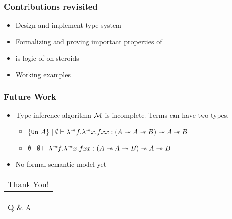 \begin{frame}[fragile, c]
    \frametitle{Contributions revisited}
  \begin{itemize}
  \item
    Design and implement \qub{} type system
  \item Formalizing and proving important properties of \qub{}
  \item \qub{} is logic of \BI on steroids
  \item {\color{red}Working examples}
  \end{itemize}
\end{frame}

\begin{frame}[fragile, c]
  \frametitle{Future Work}
  \begin{itemize}
  \item Type inference algorithm $\mathcal{M}{}$ is incomplete.
    Terms can have two types.
    \begin{itemize}
  \item $\{\texttt{Un}\ A\} \mid \emptyset \vdash \lambda^{\sepimp}f. \lambda^{\sepimp}x. f x x: (A \sepimp A \sepimp B) \sepimp A \sepimp B$
  \item $\emptyset \mid \emptyset \vdash \lambda^{\mathrel{-\mkern-6mu*}}f. \lambda^{\mathrel{-\mkern-6mu*}}x. f x x: (A \mathrel{-\mkern-6mu*} A \twoheadrightarrow B) \mathrel{-\mkern-6mu*} A \twoheadrightarrow B$
  \end{itemize}
  \item No formal semantic model yet
  \end{itemize}
\end{frame}



\begin{frame}[fragile, c]
  \begin{center}
    \begin{tabular}[h]{c}
      \Huge  Thank You!
    \end{tabular}
  \end{center}
\end{frame}

\begin{frame}[fragile, c]
  \begin{center}
    \begin{tabular}[h]{c}
      \Huge Q \& A
    \end{tabular}
  \end{center}
\end{frame}